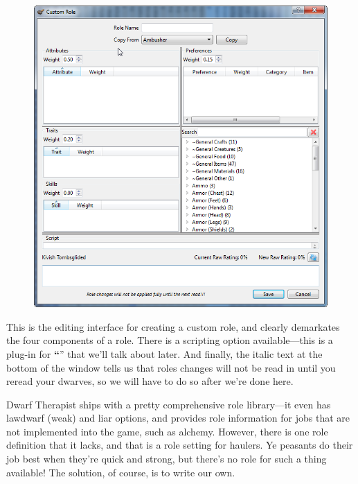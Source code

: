 \documentclass[]{article}
\newcommand{\jump}[1] {\textbf{``\nameref{sec:#1}}''}
\newcommand{\legacy}[1] {
\begin{center}
\colorbox{legacy-content}{
\begin{minipage}[t]{0.95\linewidth}
#1
\end{minipage}
}
\end{center}
}
\begin{document}
\begin{figure}[h!]
\centering
\includegraphics[scale=.85]{Sec3Fig8}
\end{figure}

\newpage
This is the editing interface for creating a custom role, and clearly demarkates the four components of a
role. There is a scripting option available---this is a plug-in for \jump{Filter
Scripts} that we'll talk about later. And finally, the italic text at the bottom of the window tells us
that roles changes will not be read in until you reread your dwarves, so we will have to do so after
we're done here.

Dwarf Therapist ships with a pretty comprehensive role library---it even has lawdwarf (weak) and liar
options, and provides role information for jobs that are not implemented into the game, such as alchemy.
However, there is one role definition that it lacks, and that is a role setting for haulers. Ye peasants
do their job best when they're quick and strong, but there's no role for such a thing available! The
solution, of course, is to write our own.
\end{document}
